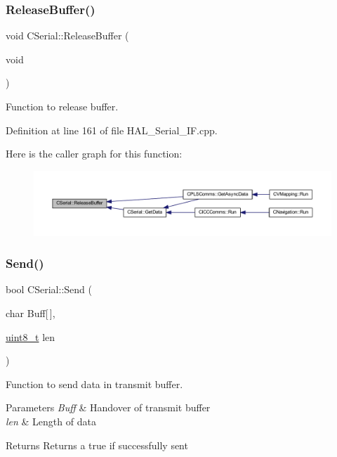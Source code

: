 \subsubsection{\texorpdfstring{Release\+Buffer()}{ReleaseBuffer()}}
{\footnotesize\ttfamily void C\+Serial\+::\+Release\+Buffer (\begin{DoxyParamCaption}\item[{void}]{ }\end{DoxyParamCaption})}



Function to release buffer. 



Definition at line 161 of file H\+A\+L\+\_\+\+Serial\+\_\+\+I\+F.\+cpp.

Here is the caller graph for this function\+:\nopagebreak
\begin{figure}[H]
\begin{center}
\leavevmode
\includegraphics[width=350pt]{class_c_serial_a941e5cae2ca04518925a3b32f51110a6_icgraph}
\end{center}
\end{figure}
\mbox{\label{class_c_serial_ae5bec6d6a1c75839ae02cf0069d1f08e}} 
\subsubsection{\texorpdfstring{Send()}{Send()}}
{\footnotesize\ttfamily bool C\+Serial\+::\+Send (\begin{DoxyParamCaption}\item[{char}]{Buff\mbox{[}$\,$\mbox{]},  }\item[{\mbox{\hyperlink{_a_d_a_s___types_8h_aba7bc1797add20fe3efdf37ced1182c5}{uint8\+\_\+t}}}]{len }\end{DoxyParamCaption})}



Function to send data in transmit buffer. 


\begin{DoxyParams}{Parameters}
{\em Buff} & Handover of transmit buffer \\
\hline
{\em len} & Length of data \\
\hline
\end{DoxyParams}
\begin{DoxyReturn}{Returns}
Returns a true if successfully sent 
\end{DoxyReturn}


